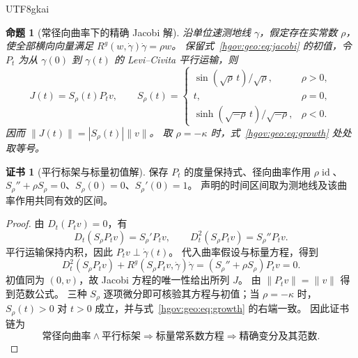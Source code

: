\documentclass[12pt,a4paper,openany,notitlepage]{report}
\theoremstyle{plain}
\newtheorem{proposition}[theorem]{命题}
\theoremstyle{definition}
\newtheorem*{certificate}{证书}
\theoremstyle{remark}
\begin{document}
\begin{CJK*}{UTF8}{gkai}
\begin{proposition}[常径向曲率下的精确 Jacobi 解]
\label{exp:geo:prop:constant-jacobi}
沿单位速测地线 $\gamma$，假定存在实常数 $\rho$，使全部横向向量满足
$R^g(w,\dot\gamma)\dot\gamma=\rho w$。
保留式~\eqref{hgov:geo:eq:jacobi} 的初值，令 $P_t$ 为从 $\gamma(0)$ 到 $\gamma(t)$ 的 Levi--Civita 平行运输，则
\[
J(t)=S_\rho(t)P_tv,
\qquad
S_\rho(t)=
\begin{cases}
\sin(\sqrt\rho\,t)/\sqrt\rho,&\rho>0,\\
t,&\rho=0,\\
\sinh(\sqrt{-\rho}\,t)/\sqrt{-\rho},&\rho<0.
\end{cases}
\]
因而 $\lVert J(t)\rVert=|S_\rho(t)|\lVert v\rVert$。
取 $\rho=-\kappa$ 时，式~\eqref{hgov:geo:eq:growth} 处处取等号。
\end{proposition}
\begin{certificate}[平行标架与标量初值解]
保存 $P_t$ 的度量保持式、径向曲率作用 $\rho\operatorname{id}$、
$S_\rho''+\rho S_\rho=0$、$S_\rho(0)=0$、$S_\rho'(0)=1$。
声明的时间区间取为测地线及该曲率作用共同有效的区间。
\end{certificate}
\begin{proof}
由 $D_t(P_tv)=0$，有
\[
D_t(S_\rho P_tv)=S_\rho'P_tv,
\qquad
D_t^2(S_\rho P_tv)=S_\rho''P_tv.
\]
平行运输保持内积，因此 $P_tv\perp\dot\gamma(t)$。
代入曲率假设与标量方程，得到
\[
D_t^2(S_\rho P_tv)+R^g(S_\rho P_tv,\dot\gamma)\dot\gamma
=(S_\rho''+\rho S_\rho)P_tv=0.
\]
初值同为 $(0,v)$，故 Jacobi 方程的唯一性给出所列 $J$。
由 $\lVert P_tv\rVert=\lVert v\rVert$ 得到范数公式。
三种 $S_\rho$ 逐项微分即可核验其方程与初值；当 $\rho=-\kappa$ 时，
$S_\rho(t)>0$ 对 $t>0$ 成立，并与式~\eqref{hgov:geo:eq:growth} 的右端一致。
因此证书链为
\[
\text{常径向曲率}\land\text{平行标架}
\Longrightarrow\text{标量常系数方程}
\Longrightarrow\text{精确变分及其范数}.
\]
\end{proof}


\end{CJK*}
\end{document}
